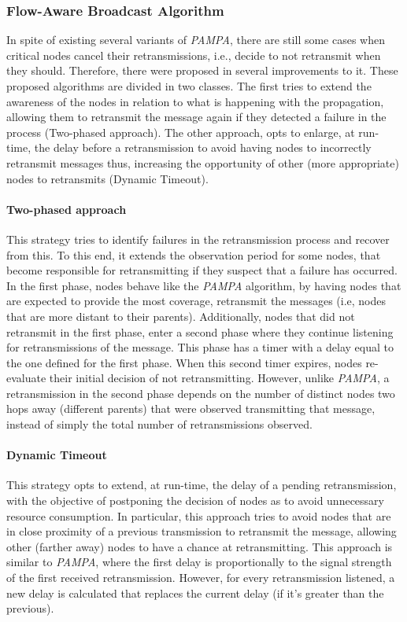 \documentclass[conference]{IEEEtran}
\begin{document}
\subsubsection{Flow-Aware Broadcast Algorithm}

In spite of existing several variants of \emph{PAMPA}, there are still some cases when critical nodes cancel their retransmissions, i.e., decide to not retransmit when they should. Therefore, there were proposed in \cite{flowaware} several improvements to it. These proposed algorithms are divided in two classes. The first tries to extend the awareness of the nodes in relation to what is happening with the propagation, allowing them to retransmit the message again if they detected a failure in the process (Two-phased approach). The other approach, opts to enlarge, at run-time, the delay before a retransmission to avoid having nodes to incorrectly retransmit messages thus, increasing the opportunity of other (more appropriate) nodes to retransmits (Dynamic Timeout).

\paragraph{Two-phased approach}
This strategy tries to identify failures in the retransmission process and recover from this. To this end, it extends the observation period for some nodes, that become responsible for retransmitting if they suspect that a failure has occurred. In the first phase, nodes behave like the \emph{PAMPA} algorithm, by having nodes that are expected to provide the most coverage, retransmit the messages (i.e, nodes that are more distant to their parents). Additionally, nodes that did not retransmit in the first phase, enter a second phase where they continue listening for retransmissions of the message. This phase has a timer with a delay equal to the one defined for the first phase. When this second timer expires, nodes re-evaluate their initial decision of not retransmitting. However, unlike \emph{PAMPA}, a retransmission in the second phase depends on the number of distinct nodes two hops away (different parents) that were observed transmitting that message, instead of simply the total number of retransmissions observed.

\paragraph{Dynamic Timeout}
This strategy opts to extend, at run-time, the delay of a pending retransmission, with the objective of postponing the decision of nodes as to avoid unnecessary resource consumption. In particular, this approach tries to avoid nodes that are in close proximity of a previous transmission to retransmit the message, allowing other (farther away) nodes to have a chance at retransmitting. This approach is similar to \emph{PAMPA}, where the first delay is proportionally to the signal strength of the  first received retransmission. However, for every retransmission listened, a new delay is calculated that replaces the current delay (if it's greater than the previous).
\end{document}
